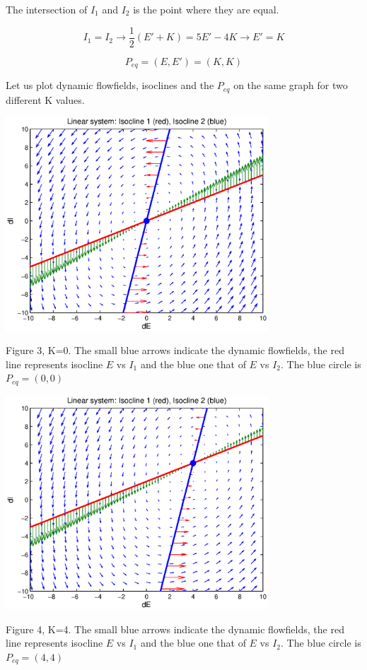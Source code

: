 \documentclass{article}
\begin{document}
The intersection of $I_1$ and $I_2$ is the point where they are equal.

\begin{equation*}
 I_1=I_2 \longrightarrow \frac{1}{2}(E'+K)=5E'-4K \longrightarrow E'=K
\end{equation*}

\begin{equation}
 P_{eq}=(E,E')=(K,K)
\end{equation}

Let us plot dynamic flowfields, isoclines and the $P_{eq}$ on the same graph for two different K values. 
\begin{center}
 \includegraphics[width=\textwidth, height=8cm]{nonlinear3.eps}
\begin{footnotesize}Figure 3, K=0. The small blue arrows indicate the dynamic flowfields, the red line represents isocline $E$ vs $I_1$ and the blue one that of $E$ vs $I_2$. The blue circle is $P_{eq}=(0,0)$ \end{footnotesize}
\end{center}


\begin{center}
 \includegraphics[width=\textwidth, height=8cm]{nonlinear4.eps}
\begin{footnotesize}Figure 4, K=4. The small blue arrows indicate the dynamic flowfields, the red line represents isocline $E$ vs $I_1$ and the blue one that of $E$ vs $I_2$. The blue circle is $P_{eq}=(4,4)$ \end{footnotesize}
\end{center}
\end{document}
